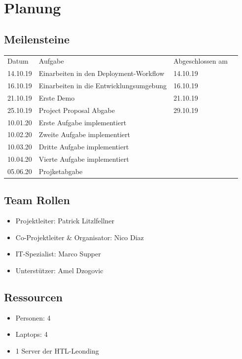 \documentclass[12pt]{article}
\theoremstyle{definition}
\begin{document}
\pagebreak
\section{Planung}
\subsection{Meilensteine}

\begin{tabular}{llll}
  Datum   & Aufgabe 											& Abgeschlossen am	\\
  14.10.19 & Einarbeiten in den Deployment-Workflow		& 14.10.19				\\
  16.10.19 & Einarbeiten in die Entwicklungsumgebung	& 16.10.19 				\\
  21.10.19 & Erste Demo 										& 21.10.19				\\
  25.10.19 & Project Proposal Abgabe							& 29.10.19				\\
  10.01.20 & Erste Aufgabe implementiert					&							\\
  10.02.20 & Zweite Aufgabe implementiert					&							\\
  10.03.20 & Dritte Aufgabe implementiert					&							\\
  10.04.20 & Vierte Aufgabe implementiert					&							\\
  05.06.20 & Projketabgabe										&
\end{tabular}

\subsection{Team Rollen}
\begin{itemize}
\item Projektleiter: Patrick Litzlfellner
\item Co-Projektleiter \& Organisator: Nico Diaz
\item IT-Spezialist: Marco Supper
\item Unterstützer: Amel Dzogovic
\end{itemize}
\subsection{Ressourcen}
\begin{itemize}
\item Personen: 4
\item Laptops: 4
\item 1 Server der HTL-Leonding
\end{itemize}
\end{document}
